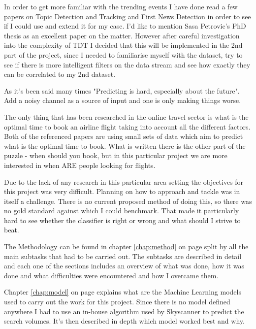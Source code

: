 \documentclass[minf,frontabs,twoside,singlespacing,parskip]{infthesis}
\begin{document}
In order to get more familiar with the trending events I have done read a few papers on Topic Detection and Tracking and First News Detection in order to see if I could use and extend it for my case. I'd like to mention Sasa Petrovic's PhD thesis as an excellent paper on the matter. \cite{Petrovic2012} However after careful investigation into the complexity of TDT I decided that this will be implemented in the 2nd part of the project, since I needed to familiarise myself with the dataset, try to see if there is more intelligent filters on the data stream and see how exactly they can be correlated to my 2nd dataset.



As it's been said many times "Predicting is hard, especially about the future".  Add a noisy channel as a source of input and one is only making things worse.



The only thing that has been researched in the online travel sector is what is the optimal time to book an airline flight taking into account all the different factors. \cite{Hamletkdd03} \cite{ijcai} 
Both of the referenced papers are using small sets of data which aim to predict what is the optimal time to book. What is written there is the other part of the puzzle - when should you book, but in this particular project we are more interested in when ARE people looking for flights.


Due to the lack of any research in this particular area setting the objectives for this project was very difficult. Planning on how to approach and tackle was in itself a challenge. There is no current proposed method of doing this, so there was no gold standard against which I could benchmark. That made it particularly hard to see whether the classifier is right or wrong and what should I strive to beat.


The Methodology can be found in chapter \ref{chap:method} on page \pageref{chap:method} split by all the main subtasks that had to be carried out. The subtasks are described in detail and each one of the sections includes an overview of what was done, how it was done and what difficulties were encountered and how I overcame them. 


Chapter \ref{chap:model} on page \pageref{chap:model} explains what are the Machine Learning models used to carry out the work for this project. Since there is no model defined anywhere I had to use an in-house algorithm used by Skyscanner to predict the search volumes. It's then described in depth which model worked best and why. 
\end{document}
